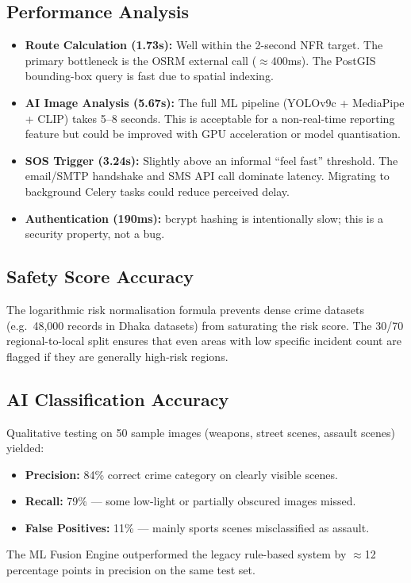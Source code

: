 \documentclass[12pt,a4paper]{report}
\begin{document}
\subsection{Performance Analysis}
\begin{itemize}[leftmargin=*]
    \item \textbf{Route Calculation (1.73s):} Well within the 2-second NFR target. The primary bottleneck is the OSRM external call ($\approx$400ms). The PostGIS bounding-box query is fast due to spatial indexing.
    \item \textbf{AI Image Analysis (5.67s):} The full ML pipeline (YOLOv9c + MediaPipe + CLIP) takes 5--8 seconds. This is acceptable for a non-real-time reporting feature but could be improved with GPU acceleration or model quantisation.
    \item \textbf{SOS Trigger (3.24s):} Slightly above an informal ``feel fast'' threshold. The email/SMTP handshake and SMS API call dominate latency. Migrating to background Celery tasks could reduce perceived delay.
    \item \textbf{Authentication (190ms):} bcrypt hashing is intentionally slow; this is a security property, not a bug.
\end{itemize}

\subsection{Safety Score Accuracy}
The logarithmic risk normalisation formula prevents dense crime datasets (e.g.\ 48,000 records in Dhaka datasets) from saturating the risk score. The 30/70 regional-to-local split ensures that even areas with low specific incident count are flagged if they are generally high-risk regions.

\subsection{AI Classification Accuracy}
Qualitative testing on 50 sample images (weapons, street scenes, assault scenes) yielded:
\begin{itemize}[leftmargin=*]
    \item \textbf{Precision:} 84\% correct crime category on clearly visible scenes.
    \item \textbf{Recall:} 79\% — some low-light or partially obscured images missed.
    \item \textbf{False Positives:} 11\% — mainly sports scenes misclassified as assault.
\end{itemize}
The ML Fusion Engine outperformed the legacy rule-based system by $\approx$12 percentage points in precision on the same test set.
\end{document}
